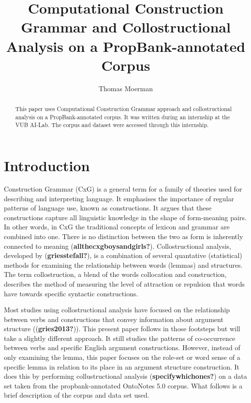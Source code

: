 \documentclass[
  letterpaper,
  DIV=11,
  numbers=noendperiod]{scrartcl}
\title{Computational Construction Grammar and Collostructional Analysis
on a PropBank-annotated Corpus}
\author{Thomas Moerman}
\date{}
\renewcommand*\contentsname{Table of contents}
\newcommand\contentsname{Table of contents}
\begin{document}
\maketitle
\begin{abstract}
This paper uses Computational Construction Grammar approach and
collostructional analysis on a PropBank-annotated corpus. It was written
during an internship at the VUB AI-Lab. The corpus and dataset were
accessed through this internship.
\end{abstract}
\ifdefined\Shaded\renewenvironment{Shaded}{\begin{tcolorbox}[boxrule=0pt, frame hidden, interior hidden, enhanced, borderline west={3pt}{0pt}{shadecolor}, breakable, sharp corners]}{\end{tcolorbox}}\fi

\renewcommand*\contentsname{Table of contents}
{
\hypersetup{linkcolor=}
\setcounter{tocdepth}{3}
\tableofcontents
}
\listoffigures
\listoftables
\hypertarget{introduction}{%
\section{Introduction}\label{introduction}}

Construction Grammar (CxG) is a general term for a family of theories
used for describing and interpreting language. It emphasises the
importance of regular patterns of language use, known as constructions.
It argues that these constructions capture all linguistic knowledge in
the shape of form-meaning pairs. In other words, in CxG the traditional
concepts of lexicon and grammar are combined into one. There is no
distinction between the two as form is inherently connected to meaning
(\textbf{allthecxgboysandgirls?}). Collostructional analysis, developed
by (\textbf{griesstefall?}), is a combination of several quantative
(statistical) methods for examining the relationship between words
(lemmas) and structures. The term collostruction, a blend of the words
collocation and construction, describes the method of measuring the
level of attraction or repulsion that words have towards specific
syntactic constructions.

Most studies using collostructional analysis have focused on the
relationship between verbs and constructions that convey information
about argument structure ((\textbf{gries2013?})). This present paper
follows in those footsteps but will take a slightly different approach.
It still studies the patterns of co-occurrence between verbs and
specific English argument constructions. However, instead of only
examining the lemma, this paper focuses on the role-set or word sense of
a specific lemma in relation to its place in an argument structure
construction. It does this by performing collustructional analysis
(\textbf{specifywhichones?}) on a data set taken from the
propbank-annotated OntoNotes 5.0 corpus. What follows is a brief
description of the corpus and data set used.
\end{document}
